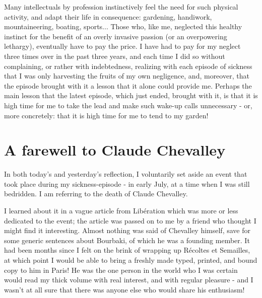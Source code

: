 Many intellectuals by profession instinctively feel the need for such physical activity, and adapt their life in consequence: gardening, handiwork, mountaineering, boating, sports... Those who, like me, neglected this healthy instinct for the benefit of an overly invasive passion (or an overpowering lethargy), eventually have to pay the price. I have had to pay for my neglect three times over in the past three years, and each time I did so without complaining, or rather with indebtedness, realizing with each episode of sickness that I was only harvesting the fruits of my own negligence, and, moreover, that the episode brought with it a lesson that it alone could provide me. Perhaps the main lesson that the latest episode, which just ended, brought with it, is that it is high time for me to take the lead and make such wake-up calls unnecessary - or, more concretely: that it is high time for me to tend to my garden!

 \section{A farewell to Claude Chevalley}
 
 \label{note:97} In both today's and yesterday's reflection, I voluntarily set aside an event that took place during my sickness-episode - in early July, at a time when I was still bedridden. I am referring to the death of Claude Chevalley.
 
 I learned about it in a vague article from Lib\'eration which was more or less dedicated to the event; the article was passed on to me by a friend who thought I might find it interesting. Almost nothing was said of Chevalley himself, save for some generic sentences about Bourbaki, of which he was a founding member. It had been months since I felt on the brink of wrapping up R\'ecoltes et Semailles, at which point I would be able to bring a freshly made typed, printed, and bound copy to him in Paris! He was the one person in the world who I was certain would read my thick volume with real interest, and with regular pleasure - and I wasn't at all sure that there was anyone else who would share his enthusiasm!
 
